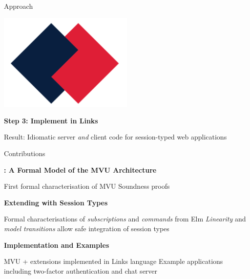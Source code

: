 \documentclass[11.5pt, aspectratio=169]{beamer}
\begin{document}
\begin{frame}{Approach}
  \begin{minipage}{0.25\textwidth}
    \begin{center}
      \includegraphics[width=0.5\textwidth]{images/links-logo.png}
    \end{center}
  \end{minipage}
  \hfill
  \begin{minipage}{0.7\textwidth}
    {\large \textbf{Step 3: Implement in Links}}
    \begin{itemize}
    \itemR Result: Idiomatic server \emph{and} client code for session-typed web applications
    \end{itemize}
  \end{minipage}
\end{frame}

\begin{frame}{Contributions}
  \begin{fullpageitemize}
  \item {\Large \textbf{\mvu: A Formal Model of the MVU Architecture}}
    \begin{itemize}
      \itemR First formal characterisation of MVU
      \itemR Soundness proofs
    \end{itemize}
    \vspace{0.25em}

  \item {\Large \textbf{Extending \mvu with Session Types}}
    \begin{itemize}
      \itemR Formal characterisations of \emph{subscriptions} and \emph{commands} from Elm
      \itemR \emph{Linearity} and \emph{model transitions} allow safe integration of session types
    \end{itemize}
    \vspace{0.25em}

  \item {\Large \textbf{Implementation and Examples}}
    \begin{itemize}
      \itemR MVU + extensions implemented in Links language
      \itemR Example applications including two-factor authentication and chat server
    \end{itemize}
  \end{fullpageitemize}
\end{frame}
\end{document}
